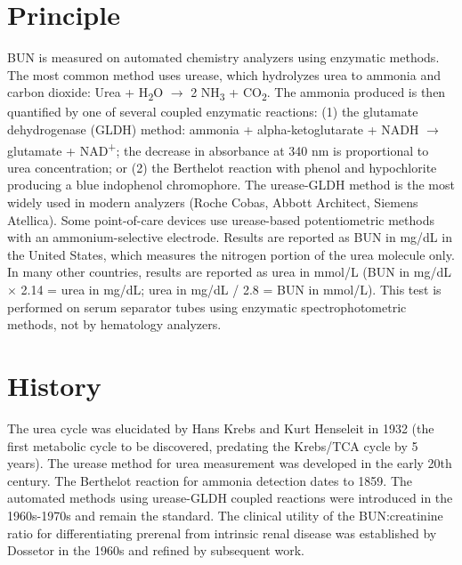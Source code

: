 \section*{Principle}
BUN is measured on automated chemistry analyzers using enzymatic methods. The most common method uses urease, which hydrolyzes urea to ammonia and carbon dioxide: Urea + H\textsubscript{2}O $\rightarrow$ 2 NH\textsubscript{3} + CO\textsubscript{2}. The ammonia produced is then quantified by one of several coupled enzymatic reactions: (1) the glutamate dehydrogenase (GLDH) method: ammonia + alpha-ketoglutarate + NADH $\rightarrow$ glutamate + NAD\textsuperscript{+}; the decrease in absorbance at 340 nm is proportional to urea concentration; or (2) the Berthelot reaction with phenol and hypochlorite producing a blue indophenol chromophore. The urease-GLDH method is the most widely used in modern analyzers (Roche Cobas, Abbott Architect, Siemens Atellica). Some point-of-care devices use urease-based potentiometric methods with an ammonium-selective electrode. Results are reported as BUN in mg/dL in the United States, which measures the nitrogen portion of the urea molecule only. In many other countries, results are reported as urea in mmol/L (BUN in mg/dL $\times$ 2.14 = urea in mg/dL; urea in mg/dL / 2.8 = BUN in mmol/L). This test is performed on serum separator tubes using enzymatic spectrophotometric methods, not by hematology analyzers.

\section*{History}
The urea cycle was elucidated by Hans Krebs and Kurt Henseleit in 1932 (the first metabolic cycle to be discovered, predating the Krebs/TCA cycle by 5 years). The urease method for urea measurement was developed in the early 20th century. The Berthelot reaction for ammonia detection dates to 1859. The automated methods using urease-GLDH coupled reactions were introduced in the 1960s-1970s and remain the standard. The clinical utility of the BUN:creatinine ratio for differentiating prerenal from intrinsic renal disease was established by Dossetor in the 1960s and refined by subsequent work.

